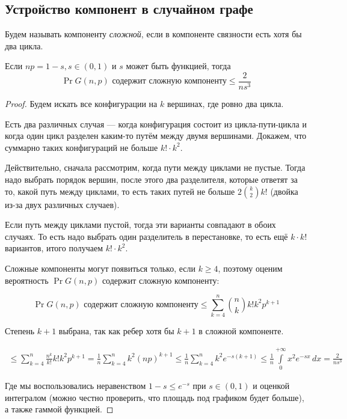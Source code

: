\subsection{Устройство компонент в случайном графе}

Будем называть компоненту \textit{сложной}, если в компоненте связности есть
хотя бы два цикла.

\begin{lemma}
  Если $np = 1 - s, s \in (0, 1)$ и $s$ может быть функцией, тогда
  \[
    \Pr{G(n, p)\text{ содержит сложную компоненту}} \leq \frac{2}{ns^3}
  \]
\end{lemma}

\begin{proof}
  Будем искать все конфигурации на $k$ вершинах, где ровно два цикла.

  Есть два различных случая --- когда конфигурация состоит из цикла-пути-цикла и
  когда один цикл разделен каким-то путём между двумя вершинами. Докажем, что
  суммарно таких конфигураций не больше $k! \cdot k^2$.

  Действительно, сначала рассмотрим, когда пути между циклами не пустые. Тогда
  надо выбрать порядок вершин, после этого два разделителя, которые ответят за то,
  какой путь между циклами, то есть таких путей не больше $2\binom{k}{2}k!$ (двойка из-за
  двух различных случаев).

  Если путь между циклами пустой, тогда эти варианты совпадают в обоих случаях.
  То есть надо выбрать один разделитель в перестановке, то есть ещё $k \cdot k!$
  вариантов, итого получаем $k! \cdot k^2$.

  Сложные компоненты могут появиться только, если $k \geq 4$, поэтому оценим
  вероятность $\Pr{G(n, p)\text{ содержит сложную компоненту}}$:

  \[
    \Pr{G(n, p)\text{ содержит сложную компоненту}} \leq \sum\limits_{k = 4}^n
    \binom{n}{k}k!k^2 p^{k + 1}
  \]

  Степень $k + 1$ выбрана, так как ребер хотя бы $k + 1$ в сложной компоненте.

  \begin{multline}
    \leq \sum\limits_{k = 4}^n \frac{n^k}{k!} k! k^2 p^{k + 1} = 
    \frac1n \sum\limits_{k = 4}^n k^2 (np)^{k + 1} \leq \frac1n \sum\limits_{k = 4}^n
    k^2 e^{-s(k + 1)} \leq \frac1n \int\limits_{0}^{+\infty} x^2e^{-sx}\,dx = \frac{2}{ns^3}
  \end{multline}

  Где мы воспользовались неравенством $1 - s \leq e^{-s}$ при $s \in (0, 1)$ и
  оценкой интегралом (можно честно проверить, что площадь под графиком
  будет больше), а также гаммой функцией.
\end{proof}

